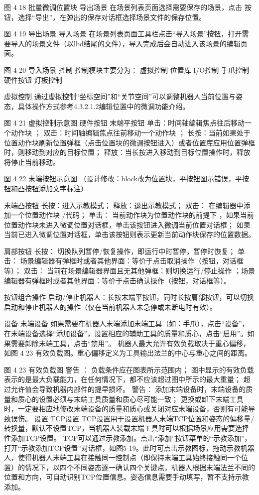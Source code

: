 图 4 18 批量微调位置块
导出场景
在场景列表页面选择需要保存的场景，点击 按钮，选择“导出”，在弹出的保存对话框选择场景文件的保存位置。 
 
 
图 4 19 导出场景
导入场景
在场景列表页面工具栏点击“导入场景”按钮，打开需要导入的场景文件（以lbd结尾的文件），导入完成后会自动进入该场景的编辑页面。
 
图 4 20 导入场景
控制
控制模块主要分为：
虚拟控制
位置库
I/O控制
手爪控制
硬件按钮
灯板控制

虚拟控制
通过虚拟控制“坐标空间”和“关节空间”可以调整机器人当前位置与姿态，具体操作方式参考4.3.2.1.2编辑位置中的微调功能介绍。
 
图 4 21  虚拟控制示意图
硬件按钮
	末端平按钮
单击：时间轴编辑焦点往后移动一个动作块 ；
双击：时间轴编辑焦点往前移动一个动作块 ；
长按：当前如果处于位置动作块刷新位置弹框（点击位置块的微调按钮进入）或者位置库应用位置弹框时，则移动到对应的目标位置；
释放：当长按进入移动到目标位置操作时，释放将停止当前移动。
 
 
图 4 22  末端按钮示意图
（设计修改：block改为位置块，平按钮图示错误，平按钮和凸按钮添加文字标注）

	末端凸按钮
长按：进入示教模式；
释放：退出示教模式；
双击： 在编辑器中添加一个位置动作块 /代码；
单击： 当前动作块为位置动作块的前提下 ，如果当前位置动作块未进入微调位置对话框，单击该按钮进入微调当前位置对话框； 如果当前已进入微调位置对话框，单击该按钮则表示更新当前动作块保存的位置数据。

	肩部按钮
长按： 切换队列暂停/恢复操作，即运行中时暂停，暂停时恢复；
单击： 场景编辑器有弹框时或者其他界面：等价于点击取消操作（按钮，对话框等）；  
双击： 当前在场景编辑器界面且无其他弹框：则切换运行/停止操作 ；场景编辑器有弹框时或者其他界面：等价于点击确认操作（按钮，对话框等）。 

	按钮组合操作 
启动/停止机器人：长按末端平按钮，同时长按肩部按钮，可以切换启动和停止机器人的操作（仅在当前机器人未急停或未断电时有效）。

设备
末端设备
如果需要在机器人末端添加末端工具（如：手爪），点击“设备”，在末端设备选择“添加设备”，设置相应的辅助工具的质量和质心，点击“启用”。如果需要卸除末端工具，点击“禁用”。
机器人最大允许有效负载取决于重心偏移，如图 4 23 有效负载图。重心偏移定义为工具输出法兰的中心与重心之间的距离。
 
图 4 23 有效负载图
 	警告 ：
负载条件应在图表所示范围内；
图中显示的有效负载表示的是最大负载能力，在任何情况下，都不应该超过图中所示的最大重量；
超过允许值会导致机器内部件的提早损坏。
 	警告：
添加末端设备时，末端设备的质量和质心的设置必须与末端工具质量和质心尽可能一致；
更换或卸下末端工具时，一定要相应地修改末端设备的质量和质心或关闭对应末端设备，否则有可能导致误伤。
设置
 TCP设置
TCP设置用于设置机器人末端TCP位置和姿态的偏移量/转换量，默认不设置TCP，当机器人装载末端工具时可以根据场景应用需要选择性添加TCP设置。
TCP可以通过示教添加。点击“添加”按钮菜单的“示教添加”，打开“示教添加TCP设置”对话框，如图5-19。此时可点击示教图标，拖动示教机器人，使得机器人末端工具在接触同一控制点（即保持末端工具始终接触同一个位置）的情况下，以四个不同姿态逐一确认四个关键点，机器人根据末端法兰不同的位置和方向，可自动识别TCP位置信息。姿态信息需要手动填写，暂不支持示教添加。
 
